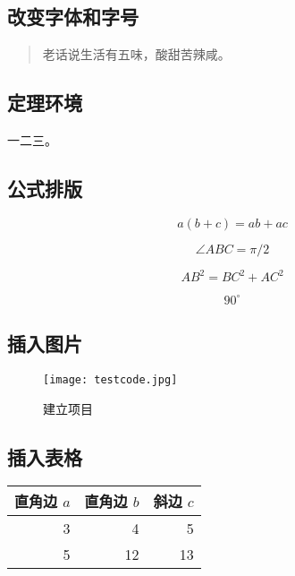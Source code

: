 \subsection{改变字体和字号}
\begin{quote}
 \kaishu 老话说生活有五味，酸甜苦辣咸。
\end{quote}

\subsection{定理环境}
\begin{thm}[勾股定理]
一二三。
\end{thm}

\subsection{公式排版}
\begin{equation}
a(b+c) = ab + ac
\end{equation}

\begin{equation}
\angle ABC = \pi / 2
\end{equation}

\begin{equation}\label{eq:gougu}
AB^2 = BC^2 + AC^2
\end{equation}

\begin{equation}
90^\circ
\end{equation}

\subsection{插入图片}
\begin{figure}[H]
\centering
\texttt{[image: testcode.jpg]} %
\caption{建立项目}
\label{fig:createproject}
\end{figure}

\subsection{插入表格}
\begin{table}[H] %
\begin{tabular}{|rrr|}
\hline
直角边 $a$ & 直角边 $b$ & 斜边 $c$ \\
\hline
3 & 4 & 5 \\  %
5 & 12 & 13 \\ %
\hline
\end{tabular}
\end{table}

